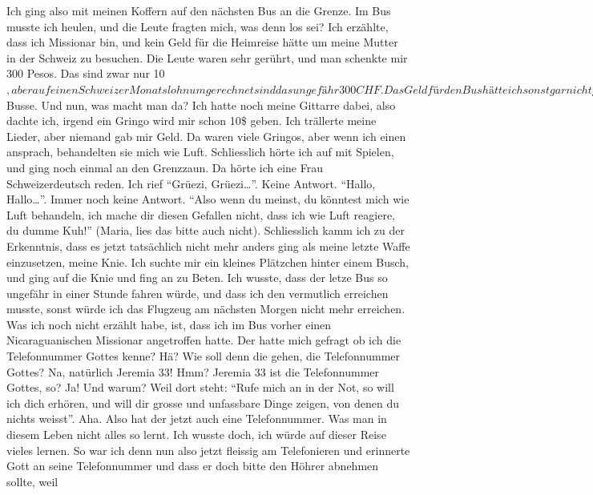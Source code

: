 \documentclass[
]{article}
\begin{document}
Ich ging also mit meinen Koffern auf den nächsten Bus an die Grenze. Im
Bus musste ich heulen, und die Leute fragten mich, was denn los sei? Ich
erzählte, dass ich Missionar bin, und kein Geld für die Heimreise hätte
um meine Mutter in der Schweiz zu besuchen. Die Leute waren sehr
gerührt, und man schenkte mir 300 Pesos. Das sind zwar nur
10\(, aber auf einen Schweizer Monatslohn umgerechnet sind das ungefähr 300 CHF. Das Geld für den Bus hätte ich sonst gar nicht gehabt. Nach 2 Stunden kamen wir an der Grenze an, und ich wollte mit den Koffern nach Costa Rica. Da hiess es, ich dürfe nicht ausreisen, ich müsse zuerst die Busse bezahlen, weil ich ja eine Woche zu lange in Nicaragua gewesen sei. Das waren 40\)
Busse. Und nun, was macht man da? Ich hatte noch meine Gittarre dabei,
also dachte ich, irgend ein Gringo wird mir schon 10\$ geben. Ich
trällerte meine Lieder, aber niemand gab mir Geld. Da waren viele
Gringos, aber wenn ich einen ansprach, behandelten sie mich wie Luft.
Schliesslich hörte ich auf mit Spielen, und ging noch einmal an den
Grenzzaun. Da hörte ich eine Frau Schweizerdeutsch reden. Ich rief
``Grüezi, Grüezi\ldots{}''. Keine Antwort. ``Hallo, Hallo\ldots{}''.
Immer noch keine Antwort. ``Also wenn du meinst, du könntest mich wie
Luft behandeln, ich mache dir diesen Gefallen nicht, dass ich wie Luft
reagiere, du dumme Kuh!'' (Maria, lies das bitte auch nicht).
Schliesslich kamm ich zu der Erkenntnis, dass es jetzt tatsächlich nicht
mehr anders ging als meine letzte Waffe einzusetzen, meine Knie. Ich
suchte mir ein kleines Plätzchen hinter einem Busch, und ging auf die
Knie und fing an zu Beten. Ich wusste, dass der letze Bus so ungefähr in
einer Stunde fahren würde, und dass ich den vermutlich erreichen musste,
sonst würde ich das Flugzeug am nächsten Morgen nicht mehr erreichen.
Was ich noch nicht erzählt habe, ist, dass ich im Bus vorher einen
Nicaraguanischen Missionar angetroffen hatte. Der hatte mich gefragt ob
ich die Telefonnummer Gottes kenne? Hä? Wie soll denn die gehen, die
Telefonnummer Gottes? Na, natürlich Jeremia 33! Hmm? Jeremia 33 ist die
Telefonnummer Gottes, so? Ja! Und warum? Weil dort steht: ``Rufe mich an
in der Not, so will ich dich erhören, und will dir grosse und unfassbare
Dinge zeigen, von denen du nichts weisst''. Aha. Also hat der jetzt auch
eine Telefonnummer. Was man in diesem Leben nicht alles so lernt. Ich
wusste doch, ich würde auf dieser Reise vieles lernen. So war ich denn
nun also jetzt fleissig am Telefonieren und erinnerte Gott an seine
Telefonnummer und dass er doch bitte den Höhrer abnehmen sollte, weil
\end{document}
